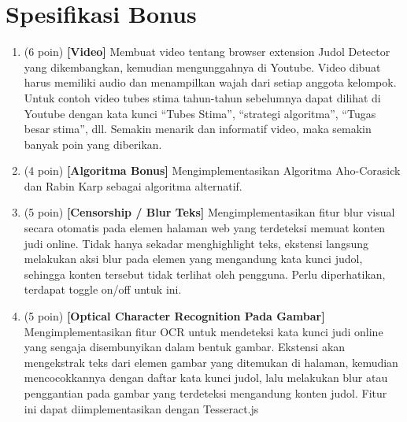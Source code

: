 \section{Spesifikasi Bonus}
\begin{enumerate}
    \item (6 poin) \textbf{[Video]} Membuat video tentang browser extension Judol Detector yang dikembangkan, kemudian mengunggahnya di Youtube. Video dibuat harus memiliki audio dan menampilkan wajah dari setiap anggota kelompok. Untuk contoh video tubes stima tahun-tahun sebelumnya dapat dilihat di Youtube dengan kata kunci “Tubes Stima”, “strategi algoritma”, “Tugas besar stima”, dll. Semakin menarik dan informatif video, maka semakin banyak poin yang diberikan.
    \item (4 poin) \textbf{[Algoritma Bonus]} Mengimplementasikan Algoritma Aho-Corasick dan Rabin Karp sebagai algoritma alternatif.
    \item (5 poin) \textbf{[Censorship / Blur Teks]} Mengimplementasikan fitur blur visual secara otomatis pada elemen halaman web yang terdeteksi memuat konten judi online. Tidak hanya sekadar menghighlight teks, ekstensi langsung melakukan aksi blur pada elemen yang mengandung kata kunci judol, sehingga konten tersebut tidak terlihat oleh pengguna. Perlu diperhatikan, terdapat toggle on/off untuk ini.
    \item (5 poin) \textbf{[Optical Character Recognition Pada Gambar]} Mengimplementasikan fitur OCR untuk mendeteksi kata kunci judi online yang sengaja disembunyikan dalam bentuk gambar. Ekstensi akan mengekstrak teks dari elemen gambar yang ditemukan di halaman, kemudian mencocokkannya dengan daftar kata kunci judol, lalu melakukan blur atau penggantian pada gambar yang terdeteksi mengandung konten judol. Fitur ini dapat diimplementasikan dengan Tesseract.js

\end{enumerate}